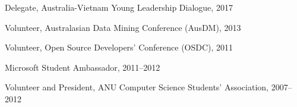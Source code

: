 \documentclass[10pt]{article}
\begin{document}
Delegate, Australia-Vietnam Young Leadership Dialogue, 2017

Volunteer, Australasian Data Mining Conference (AusDM), 2013

Volunteer, Open Source Developers' Conference (OSDC), 2011

Microsoft Student Ambassador, 2011--2012

Volunteer and President, ANU Computer Science Students' Association, 2007--2012

\begin{comment}
\begin{innerlist}
    \item Volunteer, 2007--2010
	\item President, 2011--2012
	\begin{innerlist}
		\item[$-$] Total membership for 2011: 220+, for 2012: 300+.
		\item[$-$] Notable events: 20+ BBQs, 4 Epic Games Nights, 8 technical talks (incl. Kinect development workshop, and \LaTeX{} workshops), 4 software installation events, and 2 membership recruitments.
		\item[$-$] Winner of Event of the Year in 2012 for the Epic Games Night.
		\item[$-$] Runner Up for Club of the Year in 2012.
	\end{innerlist}
\end{innerlist}
\end{comment}
\end{document}
